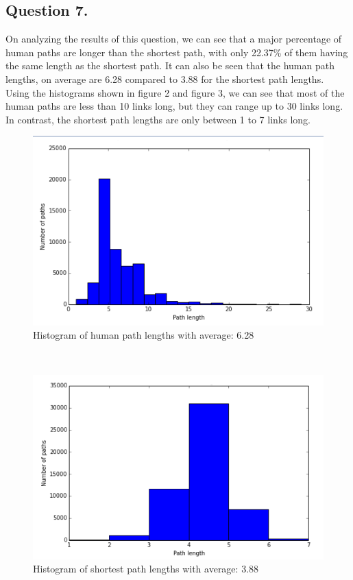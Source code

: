 \documentclass{article}
\begin{document}
\subsection{Question 7.}
On analyzing the results of this question, we can see that a major percentage of human paths are longer than the shortest path, with only 22.37\% of them having the same length as the shortest path.  It can also be seen that the human path lengths, on average are 6.28 compared to 3.88 for the shortest path lengths. \\

Using the histograms shown in figure 2 and figure 3, we can see that most of the human paths are less than 10 links long, but they can range up to 30 links long. In contrast, the shortest path lengths are only between 1 to 7 links long.\\
\begin{figure}[htbp]
\centerline{\includegraphics{human paths.png}}
\caption{Histogram of human path lengths with average: 6.28}
\label{fig}
\end{figure} \\
\begin{figure}[htbp]
\centerline{\includegraphics{shortest paths.png}}
\caption{Histogram of shortest path lengths with average: 3.88}
\label{fig}
\end{figure} \\
\newpage
\end{document}
